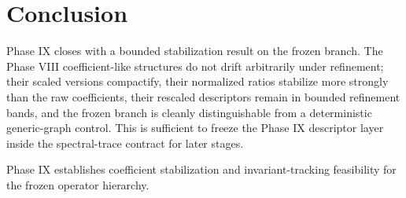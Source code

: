 \documentclass[11pt]{article}
\begin{document}
\section{Conclusion}

Phase IX closes with a bounded stabilization result on the frozen branch. The Phase VIII coefficient-like structures do not drift arbitrarily under refinement; their scaled versions compactify, their normalized ratios stabilize more strongly than the raw coefficients, their rescaled descriptors remain in bounded refinement bands, and the frozen branch is cleanly distinguishable from a deterministic generic-graph control. This is sufficient to freeze the Phase IX descriptor layer inside the spectral-trace contract for later stages.

Phase IX establishes coefficient stabilization and invariant-tracking feasibility for the frozen operator hierarchy.
\end{document}
